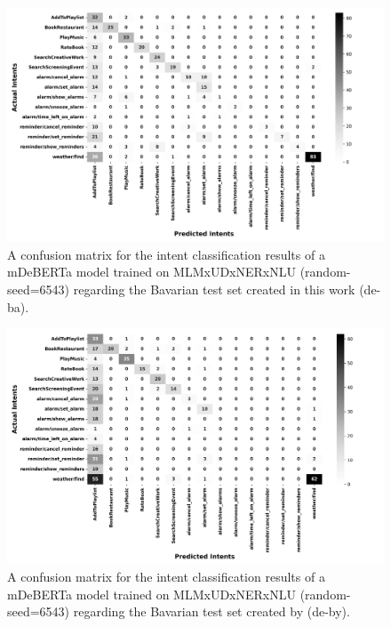 \documentclass[11pt,a4paper,twoside,openright]{scrbook}
\begin{document}
\begin{figure}[!ht]
    \centering
    \includegraphics[width=\textwidth]{ma_figures/de-ba_MLMxUDxNERxNLU.png}
    \caption{A confusion matrix for the intent classification results of a mDeBERTa model trained on MLMxUDxNERxNLU (random-seed=6543) regarding the Bavarian test set created in this work (de-ba).}
    \label{fig:de-ba_MLMxUDxNERxNLU}
\end{figure}

\begin{figure}[!ht]
    \centering
    \includegraphics[width=\textwidth]{ma_figures/de-by_MLMxUDxNERxNLU.png}
    \caption{A confusion matrix for the intent classification results of a mDeBERTa model trained on MLMxUDxNERxNLU (random-seed=6543) regarding the Bavarian test set created by \citet{winkler-etal-2024-slot-intent} (de-by).}
    \label{fig:de-by_MLMxUDxNERxNLU}
\end{figure}
\end{document}
